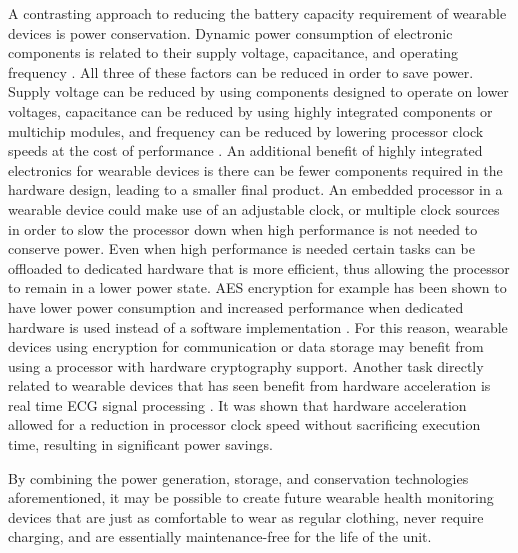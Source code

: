 A contrasting approach to reducing the battery capacity requirement of wearable 
devices is power conservation.  Dynamic power consumption of electronic 
components is related to their supply voltage, capacitance, and operating 
frequency \cite{Forman1994}. All three of these factors can be reduced in order 
to save power.  Supply voltage can be reduced by using components designed to 
operate on lower voltages, capacitance can be reduced by using highly integrated 
components or multichip modules, and frequency can be reduced by lowering 
processor clock speeds at the cost of performance \cite{Forman1994}.  An
additional benefit of highly integrated electronics for wearable devices is 
there can be fewer components required in the hardware design, leading to 
a smaller final product.  An embedded processor in a wearable device could make 
use of an adjustable clock, or multiple clock sources in order to slow the 
processor down when high performance is not needed to conserve power.  Even
when high performance is needed certain tasks can be offloaded to dedicated
hardware that is more efficient, thus allowing the processor to remain in a 
lower power state.  AES encryption for example has been shown to have lower 
power consumption and increased performance when dedicated hardware is used
instead of a software implementation \cite{Hamalainen2006}.  For this reason,
wearable devices using encryption for communication or data storage may 
benefit from using a processor with hardware cryptography support. Another task
directly related to wearable devices that has seen benefit from hardware 
acceleration is real time ECG signal processing \cite{Cardarilli2018}. It was 
shown that hardware acceleration allowed for a reduction in processor clock 
speed without sacrificing execution time, resulting in significant power 
savings.

By combining the power generation, storage, and conservation technologies 
aforementioned, it may be possible to create future wearable health monitoring 
devices that are just as comfortable to wear as regular clothing, never 
require charging, and are essentially maintenance-free for the life of the unit.

